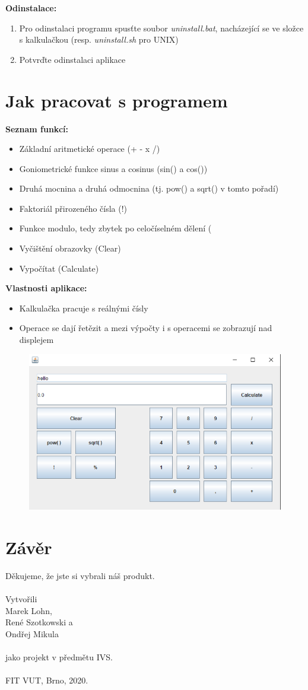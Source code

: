 \documentclass[a4paper, 11pt]{article}
\begin{document}
\noindent
\textbf{Odinstalace:}

\begin{enumerate}
    \item Pro odinstalaci programu spusťte soubor \emph{uninstall.bat}, nacházející se ve složce s kalkulačkou (resp. \emph{uninstall.sh} pro UNIX)
    \item Potvrďte odinstalaci aplikace
\end{enumerate}

\section{Jak pracovat s programem}

\textbf{Seznam funkcí:}

\begin{itemize}
    \item Základní aritmetické operace (+ - x /)
    \item Goniometrické funkce sinus a cosinus (sin() a cos())
    \item Druhá mocnina a druhá odmocnina (tj. pow() a sqrt() v tomto pořadí)
    \item Faktoriál přirozeného čísla (!)
    \item Funkce modulo, tedy zbytek po celočíselném dělení (%
    \item Vyčištění obrazovky (Clear)
    \item Vypočítat (Calculate)
\end{itemize}

\noindent
\textbf{Vlastnosti aplikace:}

\begin{itemize}
    \item Kalkulačka pracuje s reálnými čísly
    \item Operace se dají řetězit a mezi výpočty i s operacemi se zobrazují nad displejem
\end{itemize}

\begin{figure}[ht]
	\centering
	\includegraphics[width=.7\textwidth]{../screenshot.png}
\end{figure}

\section{Závěr}

Děkujeme, že jste si vybrali náš produkt.\\
\\
\noindent
Vytvořili\\Marek Lohn,\\René Szotkowski a\\Ondřej Mikula\\\\jako projekt v předmětu IVS.\\\\
FIT VUT, Brno, 2020.
\end{document}
